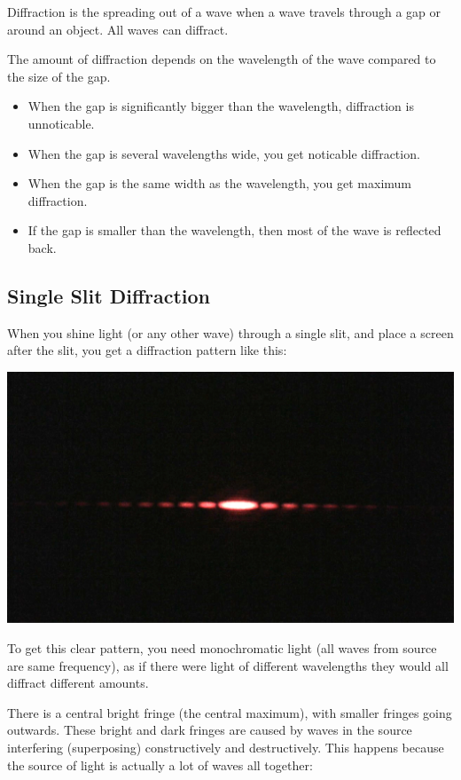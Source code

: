 \documentclass[a4paper, 12pt]{article}
\begin{document}
Diffraction is the spreading out of a wave when a wave travels through a gap or around an object.
All waves can diffract.

The amount of diffraction depends on the wavelength of the wave compared to the size of the gap.

\begin{itemize}
	\item{When the gap is significantly bigger than the wavelength, diffraction is unnoticable.}
	\item{When the gap is several wavelengths wide, you get noticable diffraction.}
	\item{When the gap is the same width as the wavelength, you get maximum diffraction.}
	\item{If the gap is smaller than the wavelength, then most of the wave is reflected back.}
\end{itemize}

\subsection{Single Slit Diffraction}

When you shine light (or any other wave) through a single slit, and place a screen after the slit, you get a diffraction pattern like this:

\begin{center}
\includegraphics[width=\textwidth]{images/singleSlitDiffPattern.jpg}
\end{center}

To get this clear pattern, you need monochromatic light (all waves from source are same frequency), as if there were light of different wavelengths they would all diffract different amounts.

There is a central bright fringe (the central maximum), with smaller fringes going outwards. These bright and dark fringes are caused by waves in the source interfering (superposing) constructively and destructively. This happens because the source of light is actually a lot of waves all together:
\end{document}
